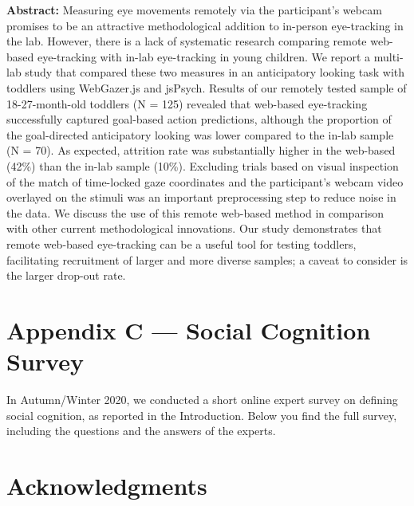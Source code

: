 \documentclass[
]{scrbook}
\begin{document}
\textbf{Abstract:} Measuring eye movements remotely via the participant's webcam promises to be an attractive methodological addition to in-person eye-tracking in the lab. However, there is a lack of systematic research comparing remote web-based eye-tracking with in-lab eye-tracking in young children. We report a multi-lab study that compared these two measures in an anticipatory looking task with toddlers using WebGazer.js and jsPsych. Results of our remotely tested sample of 18-27-month-old toddlers (N = 125) revealed that web-based eye-tracking successfully captured goal-based action predictions, although the proportion of the goal-directed anticipatory looking was lower compared to the in-lab sample (N = 70). As expected, attrition rate was substantially higher in the web-based (42\%) than the in-lab sample (10\%). Excluding trials based on visual inspection of the match of time-locked gaze coordinates and the participant's webcam video overlayed on the stimuli was an important preprocessing step to reduce noise in the data. We discuss the use of this remote web-based method in comparison with other current methodological innovations. Our study demonstrates that remote web-based eye-tracking can be a useful tool for testing toddlers, facilitating recruitment of larger and more diverse samples; a caveat to consider is the larger drop-out rate.

\chapter*{Appendix C --- Social Cognition Survey}\label{appendixC}

In Autumn/Winter 2020, we conducted a short online expert survey on defining social cognition, as reported in the Introduction. Below you find the full survey, including the questions and the answers of the experts.

\begin{minipage}{\textwidth}

\end{minipage}



\newpage

\chapter{Acknowledgments}\label{acknowledgments}
\end{document}
